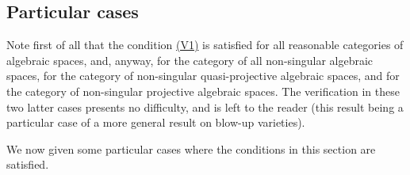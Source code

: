\documentclass{article}
\begin{document}
\subsection*{Particular cases}

Note first of all that the condition \hyperref[axiomV1]{(V1)} is satisfied for all reasonable categories of algebraic spaces, and, anyway, for the category of all non-singular algebraic spaces, for the category of non-singular quasi-projective algebraic spaces, and for the category of non-singular projective algebraic spaces.
The verification in these two latter cases presents no difficulty, and is left to the reader (this result being a particular case of a more general result on blow-up varieties).

We now given some particular cases where the conditions in this section are satisfied.
\end{document}
